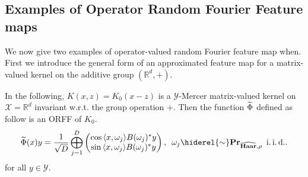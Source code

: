 
\subsection{Examples of Operator Random Fourier Feature maps}
We now give two examples of operator-valued random Fourier feature map when. First we introduce the general form of an approximated feature map for a matrix-valued kernel on the additive group $(\mathbb{R}^d,+)$.
\begin{example}\label{ex:additive_group}
In the following, $K(x,z)=K_0(x-z)$ is a $\mathcal{Y}$-Mercer matrix-valued kernel on $\mathcal{X}=\mathbb{R}^d$ invariant w.r.t. the group operation $+$. %
Then the function $\widetilde{\Phi}$ defined as follow is an \acl{ORFF} of $K_{0}$.
\begin{dmath*}
\tildePhi{\omega}(x)y=\frac{1}{\sqrt{D}}\Vect_{j=1}^D\begin{pmatrix}\cos{\inner{x,\omega_j}}B(\omega_j)^\adjoint y \\ \sin{\inner{x,\omega_j}}B(\omega_j)^\adjoint y\end{pmatrix}, \enskip \omega_j \hiderel{\sim} \probability_{\dual{\Haar},\rho} \enskip\text{\iid}.
\end{dmath*}
for all $y\in\mathcal{Y}$.
\end{example}
